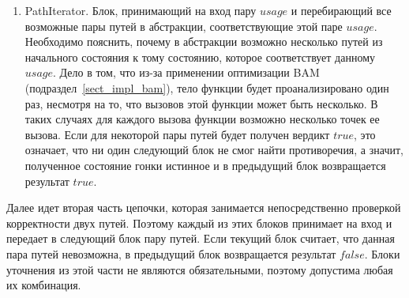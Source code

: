 \begin{enumerate}
\item PathIterator. Блок, принимающий на вход пару $usage$ и перебирающий все возможные пары путей в абстракции, соответствующие этой паре $usage$.
Необходимо пояснить, почему в абстракции возможно несколько путей из начального состояния к тому состоянию, которое соответствует данному $usage$.
Дело в том, что из-за применении оптимизации BAM (подраздел~\ref{sect_impl_bam}), тело функции будет проанализировано один раз, несмотря на то, что вызовов этой функции может быть несколько.
В таких случаях для каждого вызова функции возможно несколько точек ее вызова.
Если для некоторой пары путей будет получен вердикт $true$, это означает, что ни один следующий блок не смог найти противоречия, а значит, полученное состояние гонки истинное и в предыдущий блок возвращается результат $true$. 

\end{enumerate}

Далее идет вторая часть цепочки, которая занимается непосредственно проверкой корректности двух путей.
Поэтому каждый из этих блоков принимает на вход и передает в следующий блок пару путей.
Если текущий блок считает, что данная пара путей невозможна, в предыдущий блок возвращается результат $false$.
Блоки уточнения из этой части не являются обязательными, поэтому допустима любая их комбинация.

